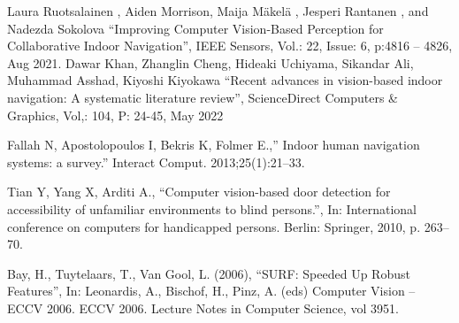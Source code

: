 \begin{thebibliography}{999}



	Laura Ruotsalainen , Aiden Morrison, Maija Mäkelä , Jesperi Rantanen , and Nadezda Sokolova  “Improving Computer Vision-Based Perception for Collaborative Indoor Navigation”, IEEE Sensors, Vol.: 22, Issue: 6, p:4816 – 4826, Aug 2021.
	Dawar Khan, Zhanglin Cheng, Hideaki Uchiyama, Sikandar Ali, Muhammad Asshad, Kiyoshi Kiyokawa “Recent advances in vision-based indoor navigation: A systematic literature review”, ScienceDirect Computers & Graphics, Vol,: 104, P: 24-45, May 2022

	Fallah N, Apostolopoulos I, Bekris K, Folmer E.,” Indoor human navigation systems: a survey.” Interact Comput. 2013;25(1):21–33.



Tian Y, Yang X, Arditi A., “Computer vision-based door detection for accessibility of unfamiliar environments to blind persons.”, In: International conference on computers for handicapped persons. Berlin: Springer, 2010, p. 263–70.


Bay, H., Tuytelaars, T., Van Gool, L. (2006), “SURF: Speeded Up Robust Features”, In: Leonardis, A., Bischof, H., Pinz, A. (eds) Computer Vision – ECCV 2006. ECCV 2006. Lecture Notes in Computer Science, vol 3951.


\end{thebibliography}
